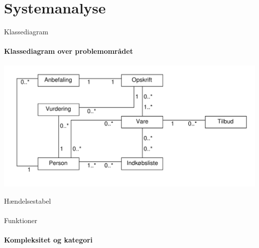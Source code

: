 \section{Systemanalyse}
\begin{frame}{Klassediagram}
	\framesubtitle{Klassediagram over problemområdet}
	\includegraphics[width=1\textwidth]{images/klassediagram_model_simple.pdf}
\end{frame}
\begin{frame}{Hændelsestabel}
	\framesubtitle{}
	
\end{frame}
\begin{frame}{Funktioner}
	\framesubtitle{Kompleksitet og kategori}
	
\end{frame}

